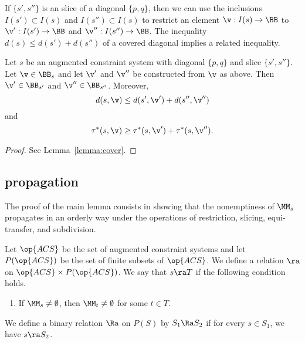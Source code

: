 If $\{s',s''\}$ is an slice of a diagonal $\{p,q\}$, then we can use the inclusions $I(s')\subset I(s)$ and $I(s'')\subset I(s)$ to restrict an element $\v:I(s)\to\BB$ to $\v':I(s')\to \BB$ and $\v'':I(s'')\to \BB$.  The inequality $d(s)\le d(s') + d(s'')$ of a covered diagonal implies a related inequality.

\begin{lemma}\label{lemma:cover2}
Let $s$ be an augmented constraint system with diagonal $\{p,q\}$ and slice
 $\{s',s''\}$. 
Let $\v\in \BB_s$ and let $\v'$ and $\v''$ be constructed from $\v$ as above.
Then  $\v'\in \BB_{s'}$ and $\v''\in \BB_{s''}$.
Moreover,
\begin{equation}
d(s,\v) \le d(s',\v') + d(s'',\v'')
\end{equation}
and
\begin{equation}
\tau^*(s,\v)\ge \tau^*(s,\v')+\tau^*(s,\v'').
\end{equation}
\end{lemma}

\begin{proof} See Lemma~\ref{lemma:cover}.
\end{proof}

\subsection{propagation}

The proof of the main lemma consists in showing that the nonemptiness
of $\MM_s$ propagates in an orderly way under the operations of
restriction, slicing, equi-transfer, and subdivision.

\begin{definition}[$\ra$~$\Ra$] 
Let $\op{ACS}$ be the set of augmented constraint systems
and let $P(\op{ACS})$ be the set of finite subsets of $\op{ACS}$. 
 We define a relation $\ra$ on $\op{ACS}\times P(\op{ACS})$.
We say that $s\ra T$ if the following condition holds.
\begin{enumerate}
\item If $\MM_s\ne\emptyset$, then 
$\MM_t\ne\emptyset$ for some $t\in T$.
\end{enumerate}
We define a binary relation $\Ra$ on $P(S)$ by
$S_1\Ra S_2$ if for every $s\in S_1$, we have $s\ra S_2$.
\end{definition}

